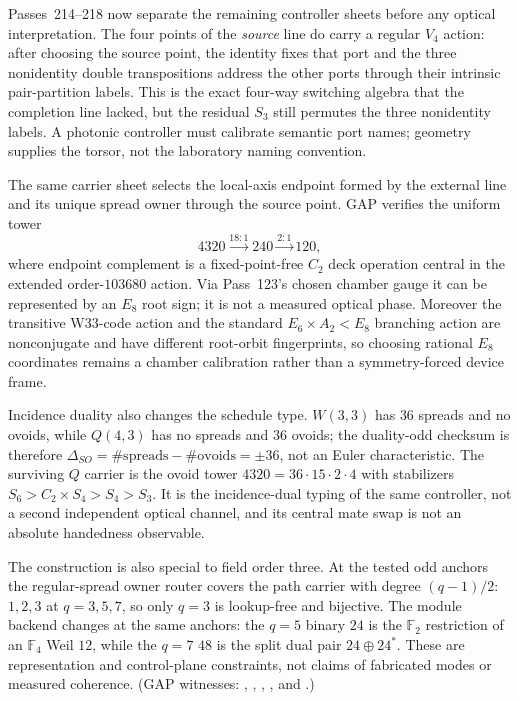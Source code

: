 \documentclass[11pt]{article}
\begin{document}
Passes~214--218 now separate the remaining controller sheets before any
optical interpretation.  The four points of the \emph{source} line do carry
a regular $V_4$ action: after choosing the source point, the identity fixes
that port and the three nonidentity double transpositions address the other
ports through their intrinsic pair-partition labels.  This is the exact
four-way switching algebra that the completion line lacked, but the residual
$S_3$ still permutes the three nonidentity labels.  A photonic controller
must calibrate semantic port names; geometry supplies the torsor, not the
laboratory naming convention.

The same carrier sheet selects the local-axis endpoint formed by the external
line and its unique spread owner through the source point.  GAP verifies the
uniform tower
\[
 4320\xrightarrow{18:1}240\xrightarrow{2:1}120,
\]
where endpoint complement is a fixed-point-free $C_2$ deck operation central
in the extended order-$103680$ action.  Via Pass~123's chosen chamber gauge it
can be represented by an $E_8$ root sign; it is not a measured optical phase.
Moreover the transitive W33-code action and the standard
$E_6\times A_2<E_8$ branching action are nonconjugate and have different
root-orbit fingerprints, so choosing rational $E_8$ coordinates remains a
chamber calibration rather than a symmetry-forced device frame.

Incidence duality also changes the schedule type.  $W(3,3)$ has $36$ spreads
and no ovoids, while $Q(4,3)$ has no spreads and $36$ ovoids; the duality-odd
checksum is therefore
$\Delta_{SO}=\#\mathrm{spreads}-\#\mathrm{ovoids}=\pm36$, not an Euler
characteristic.  The surviving $Q$ carrier
is the ovoid tower $4320=36\cdot15\cdot2\cdot4$ with stabilizers
$S_6>C_2\times S_4>S_4>S_3$.  It is the incidence-dual typing of the same
controller, not a second independent optical channel, and its central mate
swap is not an absolute handedness observable.

The construction is also special to field order three.  At the tested odd
anchors the regular-spread owner router covers the path carrier with degree
$(q-1)/2$:
$1,2,3$ at $q=3,5,7$, so only $q=3$ is lookup-free and bijective.  The module
backend changes at the same anchors: the $q=5$ binary $24$ is the
$\mathbb F_2$ restriction of an $\mathbb F_4$ Weil $12$, while the $q=7$
$48$ is the split dual pair $24\oplus24^*$.  These are representation and
control-plane constraints, not claims of fabricated modes or measured
coherence.  (GAP witnesses:
,
,
,
, and
.)
\end{document}
